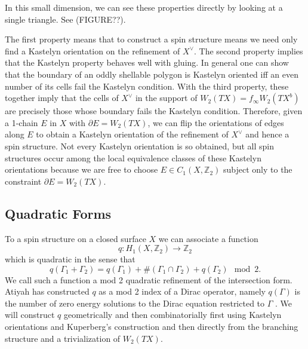 \documentclass{article}
\def\bZ{\mathbb{Z}}
\theoremstyle{definition}
\begin{document}
In this small dimension, we can see these properties directly by looking at a single triangle. See (FIGURE??).

The first property means that to construct a spin structure means we need only find a Kastelyn orientation on the refinement of $X^\vee$. The second property implies that the Kastelyn property behaves well with gluing. In general one can show that the boundary of an oddly shellable polygon is Kastelyn oriented iff an even number of its cells fail the Kastelyn condition. With the third property, these together imply that the cells of $X^\vee$ in the support of $W_2(TX) = f_\infty W_2(TX^b)$ are precisely those whose boundary fails the Kastelyn condition. Therefore, given a 1-chain $E$ in $X$ with $\partial E = W_2(TX)$, we can flip the orientations of edges along $E$ to obtain a Kastelyn orientation of the refinement of $X^\vee$ and hence a spin structure. Not every Kastelyn orientation is so obtained, but all spin structures occur among the local equivalence classes of these Kastelyn orientations because we are free to choose $E \in C_1(X,\bZ_2)$ subject only to the constraint $\partial E = W_2(TX)$.

\subsection{Quadratic Forms}

To a spin structure on a closed surface $X$ we can associate a function
\[q:H_1(X,\bZ_2) \to \bZ_2\]
which is quadratic in the sense that
\[q(\Gamma_1 + \Gamma_2) = q(\Gamma_1) + \#(\Gamma_1 \cap \Gamma_2) + q(\Gamma_2) \mod 2.\]
We call such a function a mod 2 quadratic refinement of the intersection form. Atiyah has constructed $q$ as a mod 2 index of a Dirac operator, namely $q(\Gamma)$ is the number of zero energy solutions to the Dirac equation restricted to $\Gamma$ \cite{Atiyah}. We will construct $q$ geometrically and then combinatorially first using Kastelyn orientations and Kuperberg's construction and then directly from the branching structure and a trivialization of $W_2(TX)$.
\end{document}
